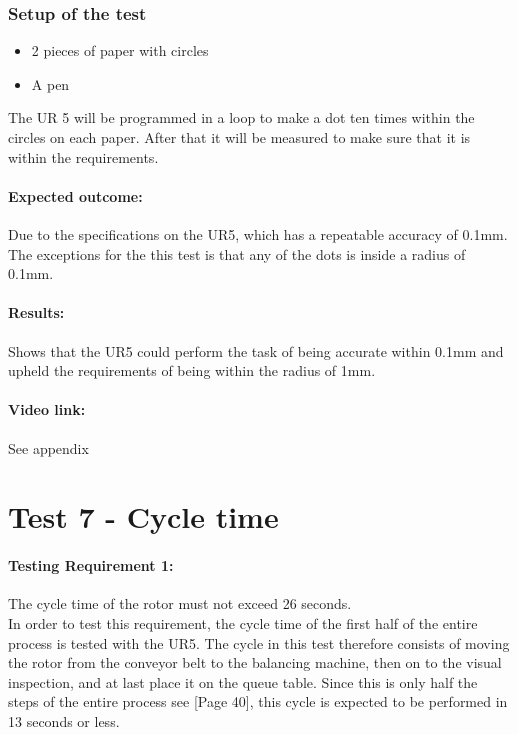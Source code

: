 \subsubsection{Setup of the test}

\begin{itemize}
 \item 2 pieces of paper with circles 
 \item A pen 
\end{itemize}

The UR 5 will be programmed in a loop to make a dot ten times within the circles on each paper. After that it will be measured to make sure that it is within the requirements.

\paragraph{Expected outcome:}
Due to the specifications on the UR5, which has a repeatable accuracy of 0.1mm. The exceptions for the this test is that any of the dots is inside a radius of 0.1mm.

\paragraph{Results: }
Shows that the UR5 could perform the task of being accurate within 0.1mm and upheld the requirements of being within the radius of 1mm. 

\paragraph{Video link: }
See appendix \cite{testfilm}

\section{Test 7 - Cycle time}

\paragraph{Testing Requirement 1:} The cycle time of the rotor must not exceed 26 seconds.\\
In order to test this requirement, the cycle time of the first half of the entire process is tested with the UR5. The cycle in this test therefore consists of moving the rotor from the conveyor belt to the balancing machine, then on to the visual inspection, and at last place it on the queue table. Since this is only half the steps of the entire process see [Page 40], this cycle is expected to be performed in 13 seconds or less. 

